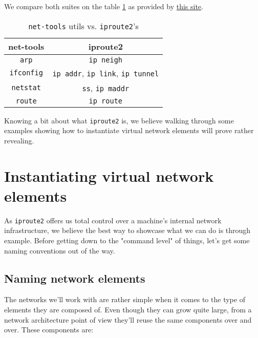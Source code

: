             We compare both suites on the table \ref{tab:net-tools-vs-iproute2} as provided by \href{https://www.thegeekdiary.com/comparing-net-tools-v-s-iproute-package-commands/}{this site}.

            \begin{table}
                \centering
                \begin{tabular}{|c|c|}
                    \hline
                    \textbf{net-tools} & \textbf{iproute2}\\
                    \hline
                    \texttt{arp} & \texttt{ip neigh}\\
                    \hline
                    \texttt{ifconfig} & \texttt{ip addr}, \texttt{ip link}, \texttt{ip tunnel}\\
                    \hline
                    \texttt{netstat} & \texttt{ss}, \texttt{ip maddr}\\
                    \hline
                    \texttt{route} & \texttt{ip route}\\
                    \hline
                \end{tabular}
                \caption{\texttt{net-tools} utils vs. \texttt{iproute2}'s}
                \label{tab:net-tools-vs-iproute2}
            \end{table}

        Knowing a bit about what \texttt{iproute2} is, we believe walking through some examples showing how to instantiate virtual network elements will prove rather revealing.

    \section{Instantiating virtual network elements}
        As \texttt{iproute2} offers us total control over a machine's internal network infrastructure, we believe the best way to showcase what we can do is through example. Before getting down to the "command level" of things, let's get some naming conventions out of the way.

        \subsection{Naming network elements}
            The networks we'll work with are rather simple when it comes to the type of elements they are composed of. Even though they can grow quite large, from a network architecture point of view they'll reuse the same components over and over. These components are:

